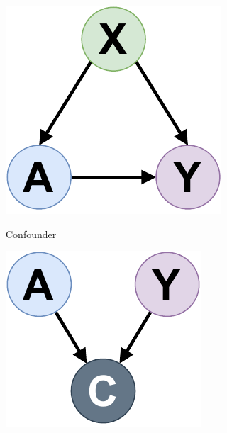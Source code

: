 \documentclass[french,12pt,twoside,a4paper]{book}
\begin{document}
\begin{figure}
  \begin{minipage}[t]{0.18\linewidth}
    \includegraphics[width=0.72\linewidth]{img/chapter_4/confounder.pdf}

    \small\sffamily Confounder
  \end{minipage}
  \hfill
  \begin{minipage}[t]{0.18\linewidth}
    \includegraphics[width=0.72\linewidth]{img/chapter_4/collider.pdf}


\end{minipage}
\end{figure}
\end{document}
